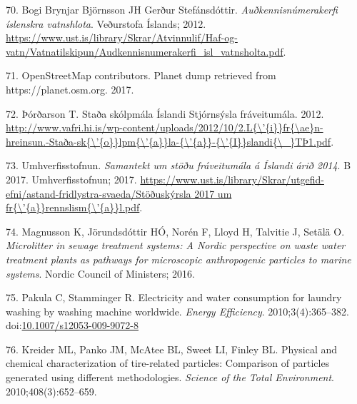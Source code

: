 \documentclass[icelandic,]{book}
\begin{document}
\leavevmode\hypertarget{ref-Bj2012}{}%
70. Bogi Brynjar Björnsson JH Gerður Stefánsdóttir. \emph{Auðkennisnúmerakerfi íslenskra vatnshlota}. Veðurstofa Íslands; 2012. \url{https://www.ust.is/library/Skrar/Atvinnulif/Haf-og-vatn/Vatnatilskipun/Audkennisnumerakerfi_isl_vatnsholta.pdf}.

\leavevmode\hypertarget{ref-OpenStreetMap}{}%
71. OpenStreetMap contributors. Planet dump retrieved from https://planet.osm.org. 2017.

\leavevmode\hypertarget{ref-uxdeoruxf0arson2012}{}%
72. Þórðarson T. Staða skólpmála Íslandi Stjórnsýsla fráveitumála. 2012. \href{http://www.vafri.hi.is/wp-content/uploads/2012/10/2.L\%7B/'\%7Bi\%7D\%7Dfr\%7B/ae\%7Dn-hreinsun.-Staða-sk\%7B/'\%7Bo\%7D\%7Dlpm\%7B/'\%7Ba\%7D\%7Dla-\%7B/'\%7Ba\%7D\%7D-\%7B/'\%7BI\%7D\%7Dslandi\%7B/_\%7DTÞ1.pdf}{http://www.vafri.hi.is/wp-content/uploads/2012/10/2.L\{\textbackslash{}'\{i\}\}fr\{\textbackslash{}ae\}n-hreinsun.-Staða-sk\{\textbackslash{}'\{o\}\}lpm\{\textbackslash{}'\{a\}\}la-\{\textbackslash{}'\{a\}\}-\{\textbackslash{}'\{I\}\}slandi\{\textbackslash{}\_\}TÞ1.pdf}.

\leavevmode\hypertarget{ref-Umhverfisstofnun2017}{}%
73. Umhverfisstofnun. \emph{Samantekt um stöðu fráveitumála á Íslandi árið 2014}. B 2017. Umhverfisstofnun; 2017. \href{https://www.ust.is/library/Skrar/utgefid-efni/astand-fridlystra-svaeda/Stöðuskýrsla\%202017\%20um\%20fr\%7B/'\%7Ba\%7D\%7Drennslism\%7B/'\%7Ba\%7D\%7Dl.pdf}{https://www.ust.is/library/Skrar/utgefid-efni/astand-fridlystra-svaeda/Stöðuskýrsla 2017 um fr\{\textbackslash{}'\{a\}\}rennslism\{\textbackslash{}'\{a\}\}l.pdf}.

\leavevmode\hypertarget{ref-magnusson2016microlitter}{}%
74. Magnusson K, Jörundsdóttir HÓ, Norén F, Lloyd H, Talvitie J, Setälä O. \emph{Microlitter in sewage treatment systems: A Nordic perspective on waste water treatment plants as pathways for microscopic anthropogenic particles to marine systems}. Nordic Council of Ministers; 2016.

\leavevmode\hypertarget{ref-Pakula2010}{}%
75. Pakula C, Stamminger R. Electricity and water consumption for laundry washing by washing machine worldwide. \emph{Energy Efficiency}. 2010;3(4):365--382. doi:\href{https://doi.org/10.1007/s12053-009-9072-8}{10.1007/s12053-009-9072-8}

\leavevmode\hypertarget{ref-kreider2010physical}{}%
76. Kreider ML, Panko JM, McAtee BL, Sweet LI, Finley BL. Physical and chemical characterization of tire-related particles: Comparison of particles generated using different methodologies. \emph{Science of the Total Environment}. 2010;408(3):652--659.
\end{document}
